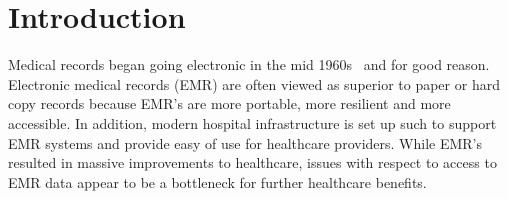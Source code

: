 \section{Introduction} \label{sec:intro}

\iffalse
Outline and Notes

Medical records went electronic for a reason
	- portability
	- resilience
	- accessibility
	- etc...
accessible for who?
	- only appears to help care providers and admin within a hospital within
	  a specific EMR domain
	- if we imagine an information chain, patient access is limited
	- researcher access is limited
Biomedical field is in the big data era thanks to EMR
	- big data affords many tools such as machine and deep learning 
	- EMR inconsistencies is a problem
		- this is why data curration exists
		- different systems, may be a result of capitalism
		- talk about the contrast of using HL7 in the back end of most
		  systems but output is different for each system
Acquiring clean and good quality medical data is important w.r.t medical and
healthcare advancement

\fi

Medical records began going electronic in the mid 1960s~\cite{TODO} and for
good reason.  Electronic medical records (EMR) are often viewed as superior to
paper or hard copy records because EMR's are more portable, more resilient and
more accessible.  In addition, modern hospital infrastructure is set up such to support
EMR systems and provide easy of use for healthcare providers.  While EMR's
resulted in massive improvements to healthcare, issues with respect to access
to EMR data appear to be a bottleneck for further healthcare benefits.  
